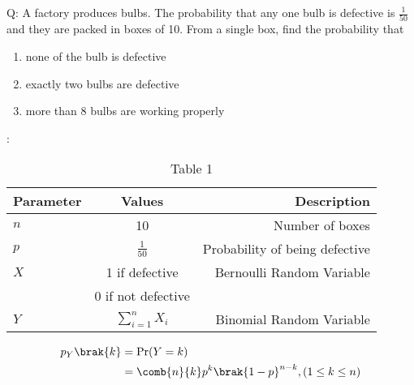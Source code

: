 \documentclass[journal,12pt,onecolumn]{IEEEtran}
\theoremstyle{remark}
\begin{document}
\let\pr\mathbf




\vspace{3cm}



\bigskip

\renewcommand{\thefigure}{\theenumi}
\renewcommand{\thetable}{\theenumi}

Q: A factory produces bulbs. The probability that any one bulb is defective is $\frac{1}{50}$ and they are packed in boxes of 10. From a single box, find the probability that
\begin{enumerate}
\item none of the bulb is defective 
\item exactly two bulbs are defective 
\item more than 8 bulbs are working properly
\end{enumerate}
\solution:
\begin{table}[h!]
 \begin{center}
    \begin{tabular}{|l|c|r|}
    \hline
    Parameter & Values & Description\\
    \hline
    $n$ & 10 & Number of boxes\\
    \hline
    $p$ & $\frac{1}{50}$ & Probability of being defective\\
    \hline
    $X$ & 1 if defective & Bernoulli Random Variable\\
    {} & 0 if not defective & {}\\
    \hline
    $Y$ & $\sum_{i=1}^nX_i$ & Binomial Random Variable\\
    \hline
    \end{tabular}
    \end{center}
    \caption{Table 1}
  \label{tab:ncert/12/13/5/13/} 
\end{table}

 \begin{align}
        p_Y\brak{k} &= \Pr(Y = k) \\
                    &= \comb{n}{k}p^k\brak{1-p}^{n-k} , (1 \le k \le n)
    \end{align}
    
\end{document}
